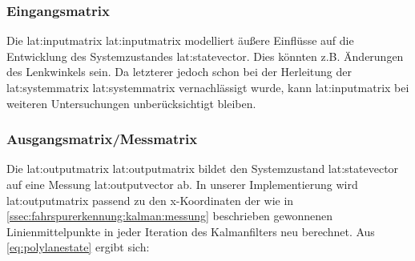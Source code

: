 \subsubsection{Eingangsmatrix}
Die \glsdesc{lat:inputmatrix} \gls{lat:inputmatrix} modelliert äußere Einflüsse auf die Entwicklung des Systemzustandes \gls{lat:statevector}. Dies könnten z.B. Änderungen des Lenkwinkels sein. Da letzterer jedoch schon bei der Herleitung der \glsdesc{lat:systemmatrix} \gls{lat:systemmatrix} vernachlässigt wurde, kann \gls{lat:inputmatrix} bei weiteren Untersuchungen unberücksichtigt bleiben.

\subsubsection{Ausgangsmatrix/Messmatrix} 
\label{sssec:fahrspurerkennung:kalman-filter:zustandsraumbeschreibung:outputmatrix}
Die \glsdesc{lat:outputmatrix} \gls{lat:outputmatrix} bildet den Systemzustand \gls{lat:statevector} auf eine Messung \gls{lat:outputvector} ab. In unserer Implementierung wird  \gls{lat:outputmatrix} passend zu den \gls{x}-Koordinaten der wie in \ref{ssec:fahrspurerkennung:kalman:messung} beschrieben gewonnenen Linienmittelpunkte in jeder Iteration des Kalmanfilters neu berechnet. Aus \ref{eq:polylanestate} ergibt sich:
